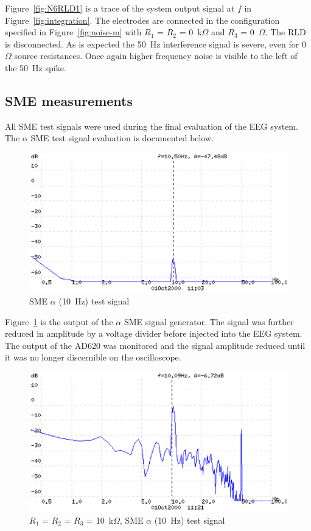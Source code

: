 Figure~\ref{fig:N6RLD1} is a trace of the system output signal at $f$
in Figure~\ref{fig:integration}. The electrodes are connected in the
configuration specified in Figure~\ref{fig:noise-m} with $R_1$ = $R_2$
= 0~k$\Omega$ and $R_3$ = 0~$\Omega$. The RLD is disconnected. As is
expected the 50~Hz interference signal is severe, even for 0~$\Omega$
source resistances. Once again higher frequency noise is visible to
the left of the 50~Hz spike.

\subsection{SME measurements}
All SME test signals were used during the final evaluation of the EEG
system. The $\alpha$ SME test signal evaluation is documented below.

\begin{figure}[htbp]
\begin{center}
	\includegraphics[width=\textwidth]{LOW10.ps} 
	\caption{SME $\alpha$ (10~Hz) test signal}
    \label{fig:LOW10}
\end{center}
\end{figure}

Figure~\ref{fig:LOW10} is the output of the $\alpha$ SME signal
generator. The signal was further reduced in amplitude by a voltage
divider before injected into the EEG system. The output of the AD620
was monitored and the signal amplitude reduced until it was no longer
discernible on the oscilloscope.


\begin{figure}[htbp]
\begin{center}
	\includegraphics[width=\textwidth]{SME10LOW.ps} 
	\caption{$R_1$ = $R_2$ = $R_3$ = 10~k$\Omega$, SME $\alpha$ (10~Hz) test signal}
    \label{fig:SME10LOW}
\end{center}
\end{figure}


